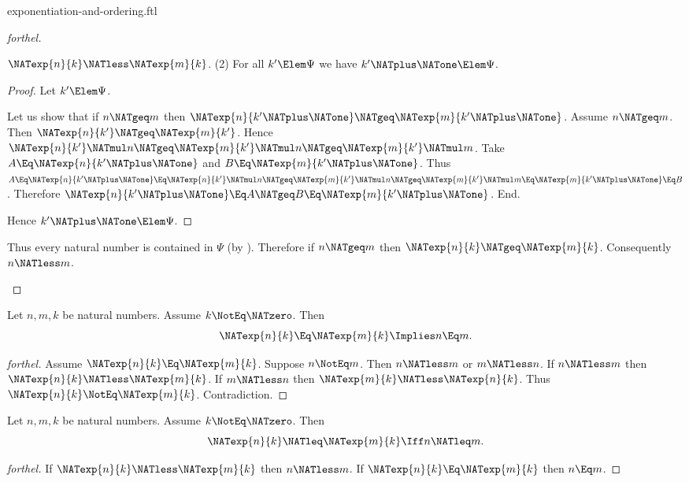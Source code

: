 \documentclass{stex}
\begin{document}
\begin{smodule}{exponentiation-and-ordering.ftl}
\begin{proof}[forthel]
\begin{case}{$\NATexp{n}{k} \NATless \NATexp{m}{k}$.}
    (2) For all $k' \Elem \Psi$ we have $k' \NATplus \NATone \Elem \Psi$.
    \begin{proof}
      Let $k' \Elem \Psi$.

      Let us show that if $n \NATgeq m$ then $\NATexp{n}{k' \NATplus \NATone} \NATgeq \NATexp{m}{k' \NATplus \NATone}$.
        Assume $n \NATgeq m$.
        Then $\NATexp{n}{k'} \NATgeq \NATexp{m}{k'}$.
        Hence $\NATexp{n}{k'} \NATmul n \NATgeq \NATexp{m}{k'} \NATmul n \NATgeq \NATexp{m}{k'} \NATmul m$.
        Take $A \Eq \NATexp{n}{k' \NATplus \NATone}$ and $B \Eq \NATexp{m}{k' \NATplus \NATone}$. %
        Thus $A
          \Eq \NATexp{n}{k' \NATplus \NATone}
          \Eq \NATexp{n}{k'} \NATmul n
          \NATgeq \NATexp{m}{k'} \NATmul n
          \NATgeq \NATexp{m}{k'} \NATmul m
          \Eq \NATexp{m}{k' \NATplus \NATone}
          \Eq B$.
        Therefore $\NATexp{n}{k' \NATplus \NATone} \Eq A \NATgeq B \Eq \NATexp{m}{k' \NATplus \NATone}$.
      End.

      Hence $k' \NATplus \NATone \Elem \Psi$.
    \end{proof}

    Thus every natural number is contained in $\Psi$ (by ).
    Therefore if $n \NATgeq m$ then $\NATexp{n}{k} \NATgeq \NATexp{m}{k}$.
    Consequently $n \NATless m$.
  \end{case}
\end{proof}

\begin{corollary}[forthel]
  Let $n, m, k$ be natural numbers.
  Assume $k \NotEq \NATzero$.
  Then \[ \NATexp{n}{k} \Eq \NATexp{m}{k} \Implies n \Eq m. \]
\end{corollary}
\begin{proof}[forthel]
  Assume $\NATexp{n}{k} \Eq \NATexp{m}{k}$.
  Suppose $n \NotEq m$.
  Then $n \NATless m$ or $m \NATless n$.
  If $n \NATless m$ then $\NATexp{n}{k} \NATless \NATexp{m}{k}$.
  If $m \NATless n$ then $\NATexp{m}{k} \NATless \NATexp{n}{k}$.
  Thus $\NATexp{n}{k} \NotEq \NATexp{m}{k}$.
  Contradiction.
\end{proof}

\begin{corollary}[forthel]
  Let $n, m, k$ be natural numbers.
  Assume $k \NotEq \NATzero$.
  Then \[ \NATexp{n}{k} \NATleq \NATexp{m}{k} \Iff n \NATleq m. \]
\end{corollary}
\begin{proof}[forthel]
  If $\NATexp{n}{k} \NATless \NATexp{m}{k}$ then $n \NATless m$.
  If $\NATexp{n}{k} \Eq \NATexp{m}{k}$ then $n \Eq m$.


\end{proof}
\end{smodule}
\end{document}
